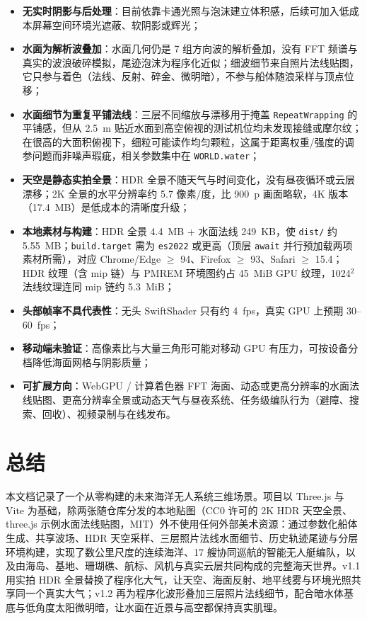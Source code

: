 \documentclass[UTF8, a4paper, 11pt]{ctexart}
\newcommand{\file}[1]{\texttt{#1}}
\begin{document}
\begin{itemize}
  \item \textbf{无实时阴影与后处理}：目前依靠卡通光照与泡沫建立体积感，后续可加入低成本屏幕空间环境光遮蔽、软阴影或辉光；
  \item \textbf{水面为解析波叠加}：水面几何仍是 7 组方向波的解析叠加，没有 FFT 频谱与真实的波浪破碎模拟，尾迹泡沫为程序化近似；细波细节来自照片法线贴图，它只参与着色（法线、反射、碎金、微明暗），不参与船体随浪采样与顶点位移；
  \item \textbf{水面细节为重复平铺法线}：三层不同缩放与漂移用于掩盖 \texttt{RepeatWrapping} 的平铺感，但从 2.5~m 贴近水面到高空俯视的测试机位均未发现接缝或摩尔纹；在很高的大面积俯视下，细粒可能读作均匀颗粒，这属于距离权重/强度的调参问题而非噪声瑕疵，相关参数集中在 \texttt{WORLD.water}；
  \item \textbf{天空是静态实拍全景}：HDR 全景不随天气与时间变化，没有昼夜循环或云层漂移；2K 全景的水平分辨率约 5.7 像素/度，比 900~p 画面略软，4K 版本（17.4~MB）是低成本的清晰度升级；
  \item \textbf{本地素材与构建}：HDR 全景 4.4~MB + 水面法线 249~KB，使 \file{dist/} 约 5.55~MB；\texttt{build.target} 需为 \texttt{es2022} 或更高（顶层 \texttt{await} 并行预加载两项素材所需），对应 Chrome/Edge $\ge$ 94、Firefox $\ge$ 93、Safari $\ge$ 15.4；HDR 纹理（含 mip 链）与 PMREM 环境图约占 45~MiB GPU 纹理，1024$^2$ 法线纹理连同 mip 链约 5.3~MiB；
  \item \textbf{头部帧率不具代表性}：无头 SwiftShader 只有约 4~fps，真实 GPU 上预期 30--60~fps；
  \item \textbf{移动端未验证}：高像素比与大量三角形可能对移动 GPU 有压力，可按设备分档降低海面网格与阴影质量；
  \item \textbf{可扩展方向}：WebGPU / 计算着色器 FFT 海面、动态或更高分辨率的水面法线贴图、更高分辨率全景或动态天气与昼夜系统、任务级编队行为（避障、搜索、回收）、视频录制与在线发布。
\end{itemize}

\section{总结}

本文档记录了一个从零构建的未来海洋无人系统三维场景。项目以 Three.js 与 Vite 为基础，除两张随仓库分发的本地贴图（CC0 许可的 2K HDR 天空全景、three.js 示例水面法线贴图，MIT）外不使用任何外部美术资源：通过参数化船体生成、共享波场、HDR 天空采样、三层照片法线水面细节、历史轨迹尾迹与分层环境构建，实现了数公里尺度的连续海洋、17 艘协同巡航的智能无人艇编队，以及由海岛、基地、珊瑚礁、航标、风机与真实云层共同构成的完整海天世界。v1.1 用实拍 HDR 全景替换了程序化大气，让天空、海面反射、地平线雾与环境光照共享同一个真实大气；v1.2 再为程序化波形叠加三层照片法线细节，配合暗水体基底与低角度太阳微明暗，让水面在近景与高空都保持真实肌理。
\end{document}
